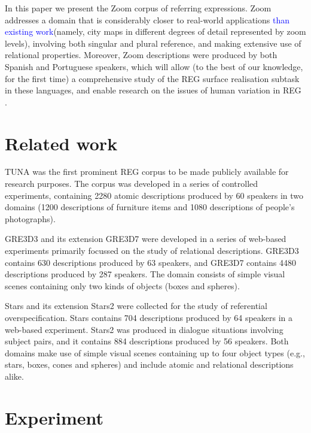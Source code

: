 \documentclass[11pt]{article}
\begin{document}
In this paper we present the Zoom corpus of referring expressions. Zoom addresses a domain that is considerably closer to real-world applications \textcolor{blue}{than existing work}(namely, city maps in different degrees of detail represented by zoom levels), involving both singular and plural reference, and making extensive use of relational properties. Moreover, Zoom descriptions were produced by both Spanish and Portuguese speakers, which will allow (to the best of our knowledge, for the first time) a comprehensive study of the REG surface realisation subtask in these languages, and enable research on the issues of human variation in REG \cite{trainable-speaker,romina-coling,non-det}. 


\section{Related work}
\label{sec-background}

TUNA \cite{tuna-corpus} was the first prominent REG corpus to be made publicly available for research purposes. The corpus was developed in a series of controlled experiments, containing 2280 atomic descriptions produced by 60 speakers in two domains (1200 descriptions of furniture items and 1080 descriptions of people's photographs). 

GRE3D3 and its extension GRE3D7 \cite{gre3d3,gre3d7} were developed in a series of web-based experiments primarily focussed on the study of relational descriptions. GRE3D3 contains 630 descriptions produced by 63 speakers, and GRE3D7 contains 4480 descriptions produced by 287 speakers. The domain consists of simple visual scenes containing only two kinds of objects (boxes and spheres).

Stars \cite{stars-mutual-disamb} and its extension Stars2 were collected for the study of referential overspecification. Stars contains 704 descriptions produced by 64 speakers in a web-based experiment. Stars2 was produced in dialogue situations involving subject pairs, and it contains 884 descriptions produced by 56 speakers. Both domains make use of simple visual scenes containing up to four object types (e.g., stars, boxes, cones and spheres) and include atomic and relational descriptions alike. 



\section{Experiment}
\label{sec-experiment}
\end{document}
